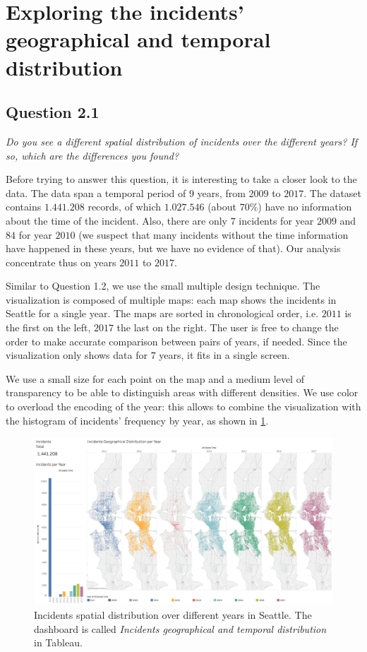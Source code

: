 \section{Exploring the incidents' geographical and temporal distribution}
\label{sec:question2}

\subsection*{Question 2.1}
\textit{Do you see a different spatial distribution of incidents over the different years? If so, which are the differences you found?}

Before trying to answer this question, it is interesting to take a closer look to the data.
The data span a temporal period of $9$ years, from $2009$ to $2017$.
The dataset contains $1.441.208$ records, of which $1.027.546$ (about $70\%$) have no information about the time of the incident.
Also, there are only $7$ incidents for year $2009$ and $84$ for year $2010$ (we suspect that many incidents without the time information have happened in these years, but we have no evidence of that).
Our analysis concentrate thus on years $2011$ to $2017$.

Similar to Question 1.2, we use the small multiple design technique.
The visualization is composed of multiple maps: each map shows the incidents in Seattle for a single year.
The maps are sorted in chronological order, i.e. $2011$ is the first on the left, $2017$ the last on the right.
The user is free to change the order to make accurate comparison between pairs of years, if needed.
Since the visualization only shows data for $7$ years, it fits in a single screen.

We use a small size for each point on the map and a medium level of transparency to be able to distinguish areas with different densities.
We use color to overload the encoding of the year:
this allows to combine the visualization with the histogram of incidents' frequency by year, as shown in \cref{fig:2_1_geographical_temporal_distribution}.

\begin{figure}[H]
	\centering
	\includegraphics[width=\columnwidth]{figures/2_1_geographical_temporal_distribution}
	\caption{Incidents spatial distribution over different years in Seattle. The dashboard is called \textit{Incidents geographical and temporal distribution} in Tableau.}
	\label{fig:2_1_geographical_temporal_distribution}
\end{figure}

